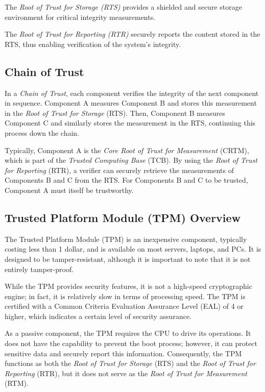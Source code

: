 The \textit{Root of Trust for Storage (RTS)} provides a shielded and 
secure storage environment for critical integrity measurements.

The \textit{Root of Trust for Reporting (RTR)} securely reports the 
content stored in the RTS, thus enabling verification of the system's 
integrity.

\subsection{Chain of Trust}

In a \textit{Chain of Trust}, each component verifies the integrity of 
the next component in sequence. Component A measures Component B and 
stores this measurement in the \textit{Root of Trust for Storage} (RTS). 
Then, Component B measures Component C and similarly stores the 
measurement in the RTS, continuing this process down the chain.

Typically, Component A is the \textit{Core Root of Trust for Measurement} 
(CRTM), which is part of the \textit{Trusted Computing Base} (TCB). By 
using the \textit{Root of Trust for Reporting} (RTR), a verifier can 
securely retrieve the measurements of Components B and C from the RTS. 
For Components B and C to be trusted, Component A must itself be 
trustworthy.

\subsection{Trusted Platform Module (TPM) Overview}

The Trusted Platform Module (TPM) is an inexpensive component,
typically costing less than 1 dollar, and is available on most servers,
laptops, and PCs. It is designed to be tamper-resistant, although it
is important to note that it is not entirely tamper-proof.

While the TPM provides security features, it is not a high-speed
cryptographic engine; in fact, it is relatively slow in terms of
processing speed. The TPM is certified with a Common Criteria
Evaluation Assurance Level (EAL) of 4 or higher, which indicates a
certain level of security assurance.

As a passive component, the TPM requires the CPU to drive its
operations. It does not have the capability to prevent the boot
process; however, it can protect sensitive data and securely report
this information. Consequently, the TPM functions as both the
\textit{Root of Trust for Storage} (RTS) and the \textit{Root of Trust
for Reporting} (RTR), but it does not serve as the \textit{Root of
Trust for Measurement} (RTM).

